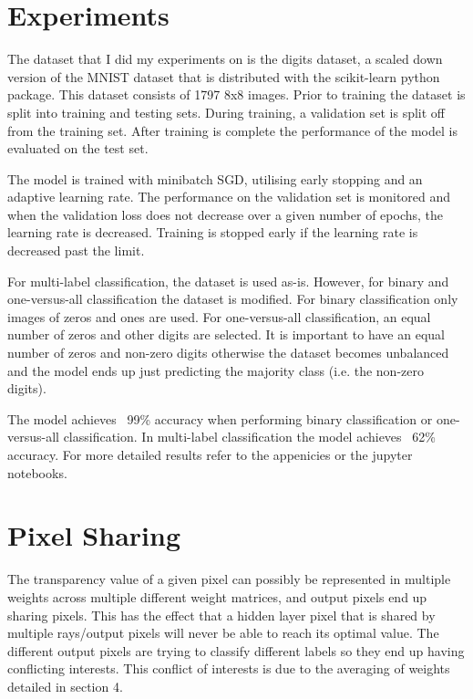 \documentclass[]{article}
\begin{document}
\section{Experiments}
The dataset that I did my experiments on is the digits dataset, a scaled down version of the MNIST dataset that is distributed with the scikit-learn python package. This dataset consists of 1797 8x8 images. Prior to training the dataset is split into training and testing sets. During training, a validation set is split off from the training set. After training is complete the performance of the model is evaluated on the test set.

The model is trained with minibatch SGD, utilising early stopping and an adaptive learning rate. 
The performance on the validation set is monitored and when the validation loss does not decrease over a given number of epochs, the learning rate is decreased. Training is stopped early if the learning rate is decreased past the limit.

For multi-label classification, the dataset is used as-is. However, for binary and one-versus-all classification the dataset is modified. For binary classification only images of zeros and ones are used. For one-versus-all classification, an equal number of zeros and other digits are selected. It is important to have an equal number of zeros and non-zero digits otherwise the dataset becomes unbalanced and the model ends up just predicting the majority class (i.e. the non-zero digits).

The model achieves ~99\% accuracy when performing binary classification or one-versus-all classification. In multi-label classification the model achieves ~62\% accuracy. For more detailed results refer to the appenicies or the jupyter notebooks.

\section{Pixel Sharing}
The transparency value of a given pixel can possibly be represented in multiple weights across multiple different weight matrices, and output pixels end up sharing pixels. This has the effect that a hidden layer pixel that is shared by multiple rays/output pixels will never be able to reach its optimal value. The different output pixels are trying to classify different labels so they end up having conflicting interests. This conflict of interests is due to the averaging of weights detailed in section 4.
\end{document}
